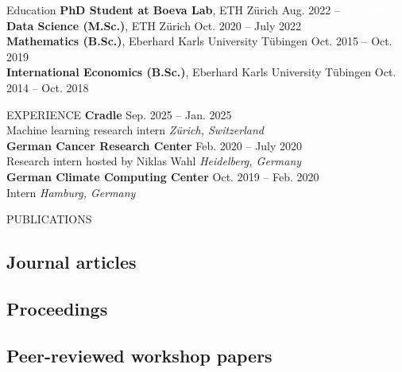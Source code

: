 \documentclass{resume} %
\begin{document}
  

\begin{rSection}{Education}
{\bf PhD Student at Boeva Lab}, ETH Zürich \hfill {Aug. 2022 -- \textcolor{white}{July 2022}}\\
{\bf Data Science (M.Sc.)}, ETH Zürich \hfill {Oct. 2020 -- July 2022}\\
{\bf Mathematics (B.Sc.)}, Eberhard Karls University Tübingen \hfill {Oct. 2015 -- Oct. 2019}\\
{\bf International Economics (B.Sc.)}, Eberhard Karls University Tübingen \hfill {Oct. 2014 -- Oct. 2018}\\
\end{rSection}
\begin{rSection}{EXPERIENCE}
\textbf{Cradle} \hfill Sep. 2025 -- Jan. 2025\\
Machine learning research intern \hfill \textit{Zürich, Switzerland}\\
\textbf{German Cancer Research Center} \hfill Feb. 2020 -- July 2020\\
Research intern hosted by Niklas Wahl \hfill \textit{Heidelberg, Germany}\\
\textbf{German Climate Computing Center} \hfill Oct. 2019 -- Feb. 2020\\
Intern \hfill \textit{Hamburg, Germany}


\end{rSection}
\begin{rSection}{PUBLICATIONS}
\end{rSection}
\vspace{-0.75cm}
\subsection*{Journal articles}
\printbibliography[keyword={press},heading={none}]
\vspace{-0.35cm}
\subsection*{Proceedings}
\printbibliography[keyword={proceedings},heading={none}]
\vspace{-0.35cm}
\subsection*{Peer-reviewed workshop papers}
\printbibliography[keyword={workshop},heading={none}]
\vspace{-0.35cm}
\end{document}
